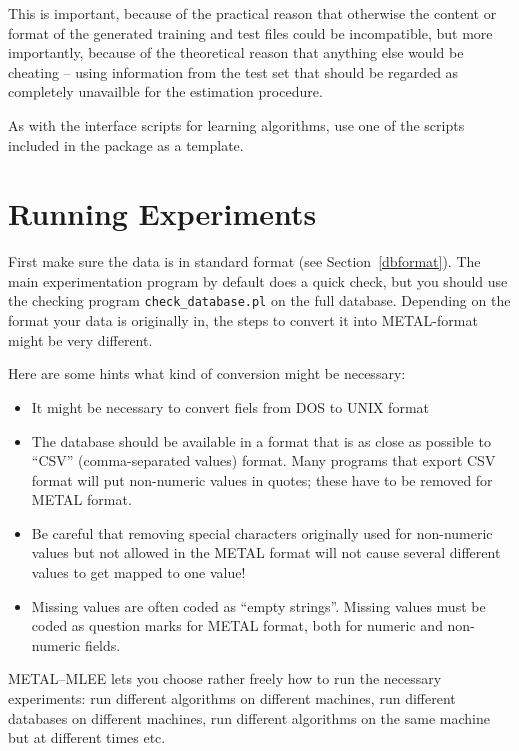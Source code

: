 \documentclass[a4paper,10pt,twoside]{article}
\newcommand{\eenameshort}{\textsf{METAL--MLEE}}
\begin{document}
This is important, because of the practical reason that otherwise
the content or format of the generated training and test files could
be incompatible, but more importantly, because of the theoretical 
reason that anything else would be cheating -- using information
from the test set that should be regarded as completely 
unavailble for the estimation procedure.

As with the interface scripts for learning algorithms, use
one of the scripts included in the package as a template.


\section{Running Experiments}
\label{exps}

First make sure the data is in standard format (see Section~\ref{dbformat}).
The main experimentation program by default does a quick check,
but you should use the checking program \texttt{check\_database.pl}
 on the full
database. Depending on the format your data is originally in,
the steps to convert it into METAL-format might be very different.

Here are some hints what kind of conversion might be necessary:

\begin{itemize}
\item It might be necessary to convert fiels from DOS to UNIX format
\item The database should be available in a format that is as close
as possible to ``CSV'' (comma-separated values) format. Many programs
that export CSV format will put non-numeric values in quotes; these
have to be removed for METAL format. 
\item Be careful that removing
special characters originally used for non-numeric values but
not allowed in the METAL format will not cause several different
values to get mapped to one value! 
\item Missing values are often coded as ``empty strings''.
Missing values must be coded as question marks for METAL format,
both for numeric and non-numeric fields.
\end{itemize}

\eenameshort{} lets you choose rather freely how to run the necessary 
experiments: run different algorithms on different machines, run
different databases on different machines, 
run different algorithms on the same machine but at different times etc.
\end{document}
